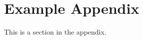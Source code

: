 \documentclass[12pt]{article}
\begin{document}



\nocite{liu2019roberta, devlin2019bert, chung2022scaling, huggingface_yelp, opitz1999popular, schapire1990strength, he2020deberta, hu2004mining, liu2012sentiment, pang2004sentimental, pang2002thumbs, rish2001empirical,acl2023ethics}

\appendix

\section{Example Appendix}
\label{sec:appendix}

This is a section in the appendix.
\end{document}
